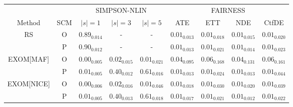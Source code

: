 
\label{tab:2}
\centering
\begin{tabular}{ccccccccc}
    \toprule
    \multicolumn{2}{c}{} & \multicolumn{3}{c}{SIMPSON-NLIN} & \multicolumn{4}{c}{FAIRNESS}\\
    \cmidrule(r){3-5} \cmidrule(r){6-9}
    Method & SCM & $|s|=1$ & $|s|=3$ & $|s|=5$ & ATE & ETT & NDE & CtfDE\\
    \midrule
    \multirow{2}{*}{RS} & O & $0.89_{0.014}$ & - & - & $0.01_{0.013}$ & $0.01_{0.018}$ & $0.01_{0.015}$ & $0.01_{0.020}$\\
    & P & $0.90_{0.012}$ & - & - & $0.01_{0.013}$ & $0.01_{0.021}$ & $0.01_{0.014}$ & $0.01_{0.023}$\\
    \midrule
    \multirow{2}{*}{EXOM[MAF]} & O & $0.00_{0.005}$ & $0.02_{0.015}$ & $0.01_{0.021}$ & $0.04_{0.095}$ & $0.06_{0.168}$ & $0.04_{0.131}$ & $0.06_{0.161}$\\
    & P & $0.01_{0.005}$ & $0.40_{0.012}$ & $0.61_{0.016}$ & $0.01_{0.013}$ & $0.01_{0.024}$ & $0.01_{0.013}$ & $0.01_{0.044}$\\
    \midrule
    \multirow{2}{*}{EXOM[NICE]} & O & $0.00_{0.006}$ & $0.02_{0.016}$ & $0.01_{0.046}$ & $0.01_{0.018}$ & $0.01_{0.030}$ & $0.01_{0.020}$ & $0.01_{0.039}$\\
    & P & $0.01_{0.005}$ & $0.40_{0.013}$ & $0.61_{0.018}$ & $0.01_{0.017}$ & $0.01_{0.021}$ & $0.01_{0.012}$ & $0.01_{0.022}$\\
    \bottomrule
\end{tabular}
